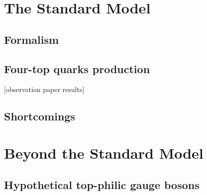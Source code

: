 \documentclass[../thesis.tex]{subfiles}
\begin{document}
\vspace{-1\baselineskip}

\section{The Standard Model}
\label{sec:SM}
\subsection{Formalism}
\subsection{Four-top quarks production}
[observation paper results]
\subsection{Shortcomings}

\section{Beyond the Standard Model}
\label{sec:BSM}
\subsection{Hypothetical top-philic gauge bosons}
\end{document}

